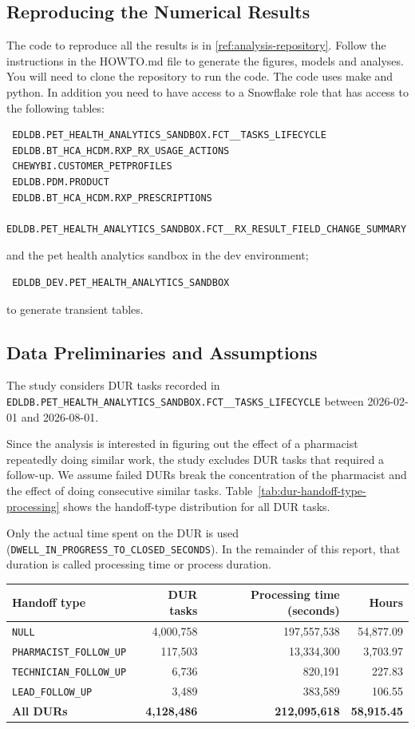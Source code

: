 \subsection{Reproducing the Numerical Results}
The code to reproduce all the results is in \ref{ref:analysis-repository}. Follow the instructions in the HOWTO.md file to generate the figures, models and analyses.
You will need to clone the repository to run the code. The code uses make and python.
In addition you need to have access to a Snowflake role that has access to the following tables:
\begin{verbatim}
 EDLDB.PET_HEALTH_ANALYTICS_SANDBOX.FCT__TASKS_LIFECYCLE
 EDLDB.BT_HCA_HCDM.RXP_RX_USAGE_ACTIONS
 CHEWYBI.CUSTOMER_PETPROFILES
 EDLDB.PDM.PRODUCT
 EDLDB.BT_HCA_HCDM.RXP_PRESCRIPTIONS
 EDLDB.PET_HEALTH_ANALYTICS_SANDBOX.FCT__RX_RESULT_FIELD_CHANGE_SUMMARY
\end{verbatim}
and the pet health analytics sandbox in the dev environment;
\begin{verbatim}
 EDLDB_DEV.PET_HEALTH_ANALYTICS_SANDBOX
\end{verbatim}
to generate transient tables.

\subsection{Data Preliminaries and Assumptions}
The study considers DUR tasks recorded in
\texttt{EDLDB.PET\_HEALTH\_ANALYTICS\_SANDBOX.FCT\_\_TASKS\_LIFECYCLE}
between 2026-02-01 and 2026-08-01.

Since the analysis is interested in figuring out the effect of a
pharmacist repeatedly doing similar work, the study excludes DUR tasks
that required a follow-up. We assume failed DURs break the
concentration of the pharmacist and the effect of doing consecutive
similar tasks.  Table~\ref{tab:dur-handoff-type-processing} shows the
handoff-type distribution for all DUR tasks.

Only the actual time spent on the DUR is used
(\texttt{DWELL\_IN\_PROGRESS\_TO\_CLOSED\_SECONDS}). In the remainder
of this report, that duration is called processing time or process
duration.
\begin{center}
\small
\begin{tabular}{@{}lrrr@{}}
\toprule
Handoff type & DUR tasks & Processing time (seconds) & Hours \\
\midrule
\texttt{NULL} & 4,000,758 & 197,557,538 & 54,877.09 \\
\texttt{PHARMACIST\_FOLLOW\_UP} & 117,503 & 13,334,300 & 3,703.97 \\
\texttt{TECHNICIAN\_FOLLOW\_UP} & 6,736 & 820,191 & 227.83 \\
\texttt{LEAD\_FOLLOW\_UP} & 3,489 & 383,589 & 106.55 \\
\midrule
\textbf{All DURs} & \textbf{4,128,486} & \textbf{212,095,618} & \textbf{58,915.45} \\
\bottomrule
\end{tabular}
\label{tab:dur-handoff-type-processing}
\end{center}

